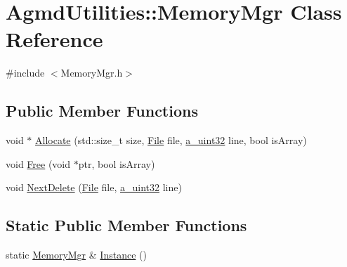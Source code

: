 \hypertarget{class_agmd_utilities_1_1_memory_mgr}{\section{Agmd\+Utilities\+:\+:Memory\+Mgr Class Reference}
\label{class_agmd_utilities_1_1_memory_mgr}
}


{\ttfamily \#include $<$Memory\+Mgr.\+h$>$}

\subsection*{Public Member Functions}
\begin{DoxyCompactItemize}
\item 
void $\ast$ \hyperlink{class_agmd_utilities_1_1_memory_mgr_a3f539e729e441fa5316efb334467511c}{Allocate} (std\+::size\+\_\+t size, \hyperlink{class_agmd_utilities_1_1_file}{File} file, \hyperlink{_common_defines_8h_a964296f9770051b9e4807b1f180dd416}{a\+\_\+uint32} line, bool is\+Array)
\item 
void \hyperlink{class_agmd_utilities_1_1_memory_mgr_ac6e98daa64ba67e15d45602f5fcc15cf}{Free} (void $\ast$ptr, bool is\+Array)
\item 
void \hyperlink{class_agmd_utilities_1_1_memory_mgr_a549c13ff5e807be036f7b6079c7fda1f}{Next\+Delete} (\hyperlink{class_agmd_utilities_1_1_file}{File} file, \hyperlink{_common_defines_8h_a964296f9770051b9e4807b1f180dd416}{a\+\_\+uint32} line)
\end{DoxyCompactItemize}
\subsection*{Static Public Member Functions}
\begin{DoxyCompactItemize}
\item 
static \hyperlink{class_agmd_utilities_1_1_memory_mgr}{Memory\+Mgr} \& \hyperlink{class_agmd_utilities_1_1_memory_mgr_aa8ce7c725c51490c44929f60b5009ab6}{Instance} ()
\end{DoxyCompactItemize}


